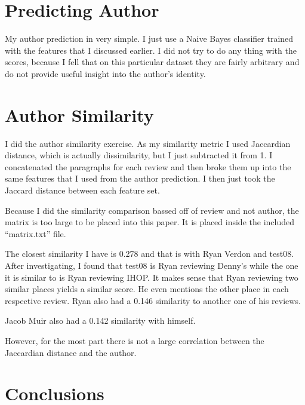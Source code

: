 \documentclass[]{IEEEtran}
\begin{document}
\section{Predicting Author}
My author prediction in very simple. I just use a Naive Bayes classifier trained with the features that I discussed earlier.
I did not try to do any thing with the scores, because I fell that on this particular dataset they are fairly arbitrary and do not provide useful insight into
the author's identity.

\section{Author Similarity}
I did the author similarity exercise. As my similarity metric I used Jaccardian distance, which is actually dissimilarity, but I just subtracted it from 1.
I concatenated the paragraphs for each review and then broke them up into the same features that I used from the author prediction.
I then just took the Jaccard distance between each feature set.

Because I did the similarity comparison bassed off of review and not author, the matrix is too large to be placed into this paper. It is placed inside the included
``matrix.txt'' file.

The closest similarity I have is 0.278 and that is with Ryan Verdon and test08. After investigating, I found that test08 is Ryan reviewing Denny's while the one it
is similar to is Ryan reviewing IHOP. It makes sense that Ryan reviewing two similar places yields a similar score. He even mentions the other place in each respective
review. Ryan also had a 0.146 similarity to another one of his reviews.

Jacob Muir also had a 0.142 similarity with himself.

However, for the most part there is not a large correlation between the Jaccardian distance and the author.

\section{Conclusions}



\end{document}
